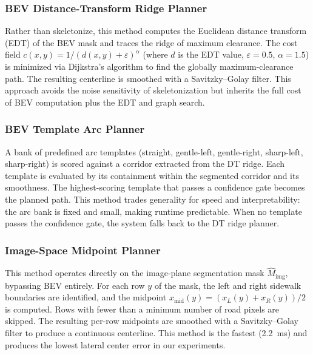 \documentclass[a4paper,fleqn,10pt]{cas-dc}
\begin{document}
\subsubsection{BEV Distance-Transform Ridge Planner}
\label{sec:dt_planner}

Rather than skeletonize, this method computes the Euclidean distance transform (EDT) of the BEV mask and traces the ridge of maximum clearance. The cost field $c(x,y) = 1/(d(x,y) + \varepsilon)^\alpha$ (where $d$ is the EDT value, $\varepsilon = 0.5$, $\alpha = 1.5$) is minimized via Dijkstra's algorithm to find the globally maximum-clearance path. The resulting centerline is smoothed with a Savitzky--Golay filter. This approach avoids the noise sensitivity of skeletonization but inherits the full cost of BEV computation plus the EDT and graph search.

\subsubsection{BEV Template Arc Planner}
\label{sec:template_planner}

A bank of predefined arc templates (straight, gentle-left, gentle-right, sharp-left, sharp-right) is scored against a corridor extracted from the DT ridge. Each template is evaluated by its containment within the segmented corridor and its smoothness. The highest-scoring template that passes a confidence gate becomes the planned path. This method trades generality for speed and interpretability: the arc bank is fixed and small, making runtime predictable. When no template passes the confidence gate, the system falls back to the DT ridge planner.

\subsubsection{Image-Space Midpoint Planner}
\label{sec:img_midpoint}

This method operates directly on the image-plane segmentation mask $\widehat{M}_\text{img}$, bypassing BEV entirely. For each row $y$ of the mask, the left and right sidewalk boundaries are identified, and the midpoint $x_\text{mid}(y) = (x_L(y) + x_R(y))/2$ is computed. Rows with fewer than a minimum number of road pixels are skipped. The resulting per-row midpoints are smoothed with a Savitzky--Golay filter to produce a continuous centerline. This method is the fastest (\SI{2.2}{ms}) and produces the lowest lateral center error in our experiments.
\end{document}
